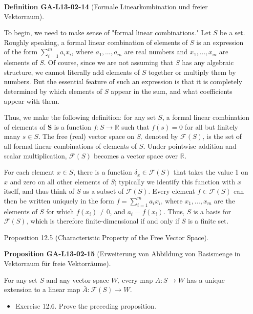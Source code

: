 \documentclass[10pt, letterpaper]{article}
\newcommand{\CustomHeading}[3]{%
  \par\medskip\noindent%
  \textbf{#1 #2} \textnormal{(#3)}.\enskip%
}
\newenvironment{DEF}[2]{\begin{unitbox}\CustomHeading{Definition}{#1}{#2}}{\end{unitbox}}
\newenvironment{PROP}[2]{\begin{unitbox}\CustomHeading{Proposition}{#1}{#2}}{\end{unitbox}}
\begin{document}
\begin{DEF}{GA-L13-02-14}{Formale Linearkombination und freier Vektorraum}
To begin, we need to make sense of "formal linear combinations." Let $S$ be a set. Roughly speaking, a formal linear combination of elements of $S$ is an expression of the form $\sum_{i=1}^{m} a_{i} x_{i}$, where $a_{1}, \ldots, a_{m}$ are real numbers and $x_{1}, \ldots, x_{m}$ are elements of $S$. 
Of course, since we are not assuming that $S$ has any algebraic structure, we cannot literally add elements of $S$ together or multiply them by numbers. But the essential feature of such an expression is that it is completely determined by which elements of $S$ appear in the sum, and what coefficients appear with them. 

Thus, we make the following definition: for any set $S$, a formal linear combination of elements of $\boldsymbol{S}$ is a function $f: S \rightarrow \mathbb{R}$ such that $f(s)=0$ for all but finitely many $s \in S$. The free (real) vector space on $S$, denoted by $\mathcal{F}(S)$, is the set of all formal linear combinations of elements of $S$. Under pointwise addition and scalar multiplication, $\mathcal{F}(S)$ becomes a vector space over $\mathbb{R}$.

For each element $x \in S$, there is a function $\delta_{x} \in \mathscr{F}(S)$ that takes the value 1 on $x$ and zero on all other elements of $S$; typically we identify this function with $x$ itself, and thus think of $S$ as a subset of $\mathscr{F}(S)$. Every element $f \in \mathscr{F}(S)$ can then be written uniquely in the form $f=\sum_{i=1}^{m} a_{i} x_{i}$, where $x_{1}, \ldots, x_{m}$ are the elements of $S$ for which $f\left(x_{i}\right) \neq 0$, and $a_{i}=f\left(x_{i}\right)$. Thus, $S$ is a basis for $\mathscr{F}(S)$, which is therefore finite-dimensional if and only if $S$ is a finite set.
\end{DEF}

Proposition 12.5 (Characteristic Property of the Free Vector Space). 


\begin{PROP}{GA-L13-02-15}{Erweiterung von Abbildung von Basismenge in Vektorraum für freie Vektorräume}
For any set $S$ and any vector space $W$, every map $A: S \rightarrow W$ has a unique extension to a linear map $\bar{A}: \mathcal{F}(S) \rightarrow W$.
\end{PROP}

\begin{itemize}
  \item Exercise 12.6. Prove the preceding proposition.
\end{itemize}
\end{document}
